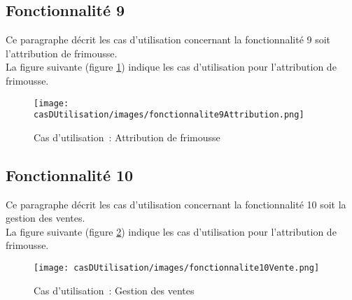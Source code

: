 \subsection{Fonctionnalité 9}
Ce paragraphe décrit les cas d'utilisation concernant la fonctionnalité 9 soit l'attribution de frimousse. \\

La figure suivante (figure \ref{diagrammeCasUtilisation9}) indique les cas d'utilisation pour l'attribution de frimousse.
\begin{figure}[H]
	\centering
	\texttt{[image: casDUtilisation/images/fonctionnalite9Attribution.png]}
	\caption{Cas d'utilisation~: Attribution de frimousse }
	\label{diagrammeCasUtilisation9}
\end{figure}

\subsection{Fonctionnalité 10}
Ce paragraphe décrit les cas d'utilisation concernant la fonctionnalité 10 soit la gestion des ventes. \\

La figure suivante (figure \ref{diagrammeCasUtilisation10}) indique les cas d'utilisation pour l'attribution de frimousse.
\begin{figure}[H]
	\centering
	\texttt{[image: casDUtilisation/images/fonctionnalite10Vente.png]}
	\caption{Cas d'utilisation~: Gestion des ventes }
	\label{diagrammeCasUtilisation10}
\end{figure}
